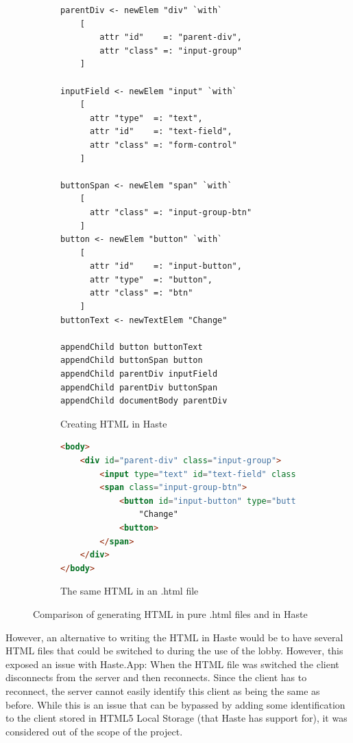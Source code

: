 \documentclass[a4paper]{article}
\begin{document}
\begin{figure}[H]
    \centering
\begin{subfigure}[b]{\textwidth}
\begin{lstlisting}
parentDiv <- newElem "div" `with`
    [
        attr "id"    =: "parent-div",
        attr "class" =: "input-group"
    ]

inputField <- newElem "input" `with`
    [
      attr "type"  =: "text",
      attr "id"    =: "text-field",
      attr "class" =: "form-control"
    ]

buttonSpan <- newElem "span" `with`
    [
      attr "class" =: "input-group-btn"
    ]
button <- newElem "button" `with`
    [
      attr "id"    =: "input-button",
      attr "type"  =: "button",
      attr "class" =: "btn"
    ]
buttonText <- newTextElem "Change"

appendChild button buttonText
appendChild buttonSpan button
appendChild parentDiv inputField
appendChild parentDiv buttonSpan
appendChild documentBody parentDiv

\end{lstlisting}
\caption{Creating HTML in Haste}
\end{subfigure}


\begin{subfigure}[b]{\textwidth}
\begin{lstlisting}[language=HTML]
<body>
    <div id="parent-div" class="input-group">
        <input type="text" id="text-field" class="form-control">
        <span class="input-group-btn">
            <button id="input-button" type="button" class="btn">
                "Change"
            <button>
        </span>
    </div>
</body>

\end{lstlisting}
\caption{The same HTML in an .html file}
\end{subfigure}

\caption{Comparison of generating HTML in pure .html files and in Haste}
\label{fig:HTML-generation}
\end{figure}

However, an alternative to writing the HTML in Haste would be to have several HTML files that could be switched to during the use of the lobby. However, this exposed an issue with Haste.App: When the HTML file was switched the client disconnects from the server and then reconnects. Since the client has to reconnect, the server cannot easily identify this client as being the same as before. While this is an issue that can be bypassed by adding some identification to the client stored in HTML5 Local Storage (that Haste has support for), it was considered out of the scope of the project.
\end{document}
